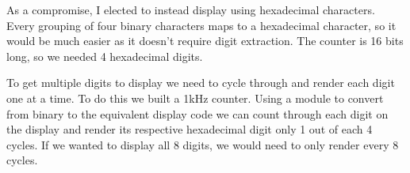 \documentclass[prb,preprint]{revtex4-1}
\begin{document}
As a compromise, I elected to instead display using hexadecimal characters. Every grouping of four binary characters maps to a hexadecimal character, so it would be much easier as it doesn't require digit extraction. The counter is 16 bits long, so we needed 4 hexadecimal digits.

To get multiple digits to display we need to cycle through and render each digit one at a time. To do this we built a 1kHz counter. Using a module to convert from binary to the equivalent display code we can count through each digit on the display and render its respective hexadecimal digit only 1 out of each 4 cycles. If we wanted to display all 8 digits, we would need to only render every 8 cycles.

\end{document}

